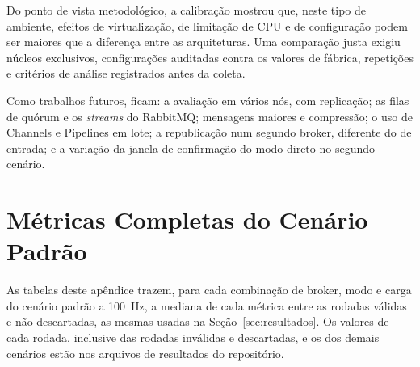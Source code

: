 \documentclass[12pt]{article}
\begin{document}
Do ponto de vista metodológico, a calibração mostrou que, neste tipo de ambiente,
efeitos de virtualização, de limitação de CPU e de configuração podem ser maiores que a
diferença entre as arquiteturas. Uma comparação justa exigiu núcleos exclusivos,
configurações auditadas contra os valores de fábrica, repetições e critérios de análise
registrados antes da coleta.

Como trabalhos futuros, ficam: a avaliação em vários nós, com replicação; as filas de
quórum e os \textit{streams} do RabbitMQ; mensagens maiores e compressão; o uso de
Channels e Pipelines em lote; a republicação num segundo broker, diferente do de
entrada; e a variação da janela de confirmação do modo direto no segundo cenário.






\appendix

\section{Métricas Completas do Cenário Padrão}
\label{sec:apendice-metricas}

As tabelas deste apêndice trazem, para cada combinação de broker, modo e carga do
cenário padrão a 100~Hz, a mediana de cada métrica entre as rodadas válidas e não
descartadas, as mesmas usadas na Seção~\ref{sec:resultados}. Os valores de cada rodada,
inclusive das rodadas inválidas e descartadas, e os dos demais cenários estão nos
arquivos de resultados do repositório.


\end{document}
